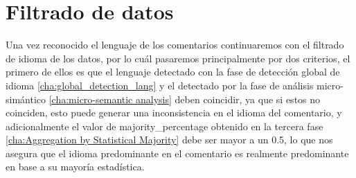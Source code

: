 \section{\textbf{Filtrado de datos}}
Una vez reconocido el lenguaje de los comentarios continuaremos con el filtrado de idioma de los datos, por lo cuál pasaremos principalmente por dos criterios, el primero de ellos es que el lenguaje detectado con la fase de detección global de idioma \ref{cha:global_detection_lang} y el detectado por la fase de análisis micro-simántico \ref{cha:micro-semantic analysis} deben coincidir, ya que si estos no coinciden, esto puede generar una inconsistencia en el idioma del comentario, y adicionalmente el valor de majority\_percentage obtenido en la tercera fase \ref{cha:Aggregation by Statistical Majority} debe ser mayor a un 0.5, lo que nos asegura que el idioma predominante en el comentario es realmente predominante en base a su mayoría estadística.